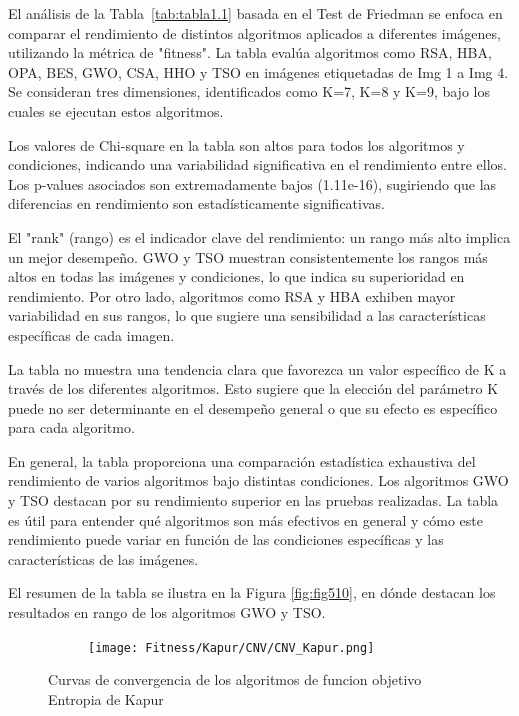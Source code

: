 \documentclass[conference]{IEEEtran}
\begin{document}
\noindent El análisis de la Tabla~\ref{tab:tabla1.1} basada en el Test de Friedman se enfoca en comparar el rendimiento de distintos algoritmos aplicados a diferentes imágenes, utilizando la métrica de "fitness". La tabla evalúa algoritmos como RSA, HBA, OPA, BES, GWO, CSA, HHO y TSO en imágenes etiquetadas de Img 1 a Img 4. Se consideran tres dimensiones, identificados como K=7, K=8 y K=9, bajo los cuales se ejecutan estos algoritmos.

\noindent Los valores de Chi-square en la tabla son altos para todos los algoritmos y condiciones, indicando una variabilidad significativa en el rendimiento entre ellos. Los p-values asociados son extremadamente bajos (1.11e-16), sugiriendo que las diferencias en rendimiento son estadísticamente significativas.

\noindent El "rank" (rango) es el indicador clave del rendimiento: un rango más alto implica un mejor desempeño. GWO y TSO muestran consistentemente los rangos más altos en todas las imágenes y condiciones, lo que indica su superioridad en rendimiento. Por otro lado, algoritmos como RSA y HBA exhiben mayor variabilidad en sus rangos, lo que sugiere una sensibilidad a las características específicas de cada imagen.

\noindent La tabla no muestra una tendencia clara que favorezca un valor específico de K a través de los diferentes algoritmos. Esto sugiere que la elección del parámetro K puede no ser determinante en el desempeño general o que su efecto es específico para cada algoritmo.

\noindent En general, la tabla proporciona una comparación estadística exhaustiva del rendimiento de varios algoritmos bajo distintas condiciones. Los algoritmos GWO y TSO destacan por su rendimiento superior en las pruebas realizadas. La tabla es útil para entender qué algoritmos son más efectivos en general y cómo este rendimiento puede variar en función de las condiciones específicas y las características de las imágenes.

\noindent El resumen de la tabla se ilustra en la Figura \ref{fig:fig510}, en dónde destacan los resultados en rango de los algoritmos GWO y TSO.



\begin{figure}
	\centering
	\begin{subfigure}{0.5\textwidth}
		\texttt{[image: Fitness/Kapur/CNV/CNV\_Kapur.png]}
	\end{subfigure}
	\caption{Curvas de convergencia de los algoritmos de funcion objetivo Entropia de Kapur}
	\label{fig:imagenes}    
\end{figure}
\end{document}

